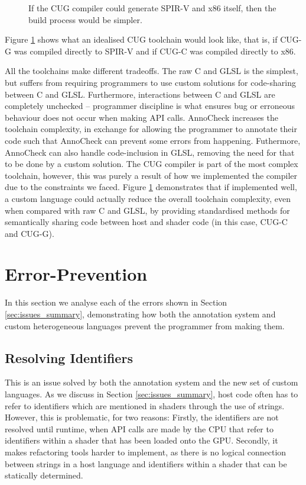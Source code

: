 \documentclass[a4paper,12pt,twoside,openright]{report}
\begin{document}
\begin{figure}[h]
\centering
\def\svgwidth{0.8\linewidth}

\caption{If the CUG compiler could generate SPIR-V and x86 itself, then the build
process would be simpler.}
\label{fig:pipeline_cug_future}
\end{figure}

Figure \ref{fig:pipeline_cug_future} shows what an idealised CUG toolchain
would look like, that is, if CUG-G was compiled directly to SPIR-V and if CUG-C
was compiled directly to x86.

All the toolchains make different tradeoffs. The raw C and GLSL is the
simplest, but suffers from requiring programmers to use custom solutions for
code-sharing between C and GLSL. Furthermore, interactions between C and GLSL
are completely unchecked -- programmer discipline is what ensures bug or
erroneous behaviour does not occur when making API calls. AnnoCheck increases
the toolchain complexity, in exchange for allowing the programmer to annotate
their code such that AnnoCheck can prevent some errors from happening.
Futhermore, AnnoCheck can also handle code-inclusion in GLSL, removing the need
for that to be done by a custom solution. The CUG compiler is part of the most
complex toolchain, however, this was purely a result of how we implemented the
compiler due to the constraints we faced. Figure \ref{fig:pipeline_cug_future}
demonstrates that if implemented well, a custom language could actually reduce
the overall toolchain complexity, even when compared with raw C and GLSL, by
providing standardised methods for semantically sharing code between host and
shader code (in this case, CUG-C and CUG-G).

\section{Error-Prevention}

In this section we analyse each of the errors shown in Section
\ref{sec:issues_summary}, demonstrating how both the annotation system and
custom heterogeneous languages prevent the programmer from making them.

\subsection{Resolving Identifiers}

\label{sec:resolving_identifiers}

This is an issue solved by both the annotation system and the new set of custom
languages. As we discuss in Section \ref{sec:issues_summary}, host code often
has to refer to identifiers which are mentioned in shaders through the use of
strings. However, this is problematic, for two reasons: Firstly, the
identifiers are not resolved until runtime, when API calls are made by the CPU
that refer to identifiers within a shader that has been loaded onto the GPU.
Secondly, it makes refactoring tools harder to implement, as there is no
logical connection between strings in a host language and identifiers within a
shader that can be statically determined.
\end{document}
